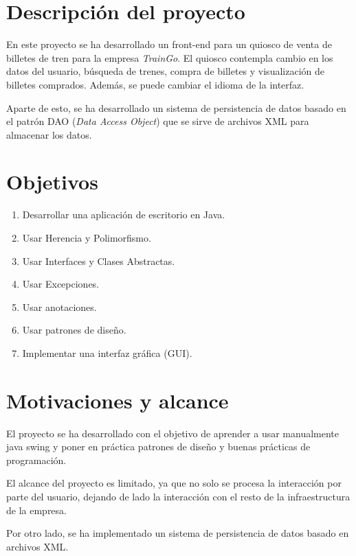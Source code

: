 \section {Descripción del proyecto}\label{sec:descripcion}
En este proyecto se ha desarrollado un front-end para un quiosco de venta de billetes
de tren para la empresa \textit{TrainGo}.
El quiosco contempla cambio en los datos del usuario, búsqueda de trenes,
compra de billetes y visualización de billetes comprados.
Además, se puede cambiar el idioma de la interfaz.

Aparte de esto, se ha desarrollado un sistema de persistencia de datos
basado en el patrón DAO (\textit{Data Access Object}) que se sirve de archivos
XML para almacenar los datos.


\section{Objetivos}\label{sec:objetivos}
\begin{enumerate}
    \item Desarrollar una aplicación de escritorio en Java.
    \item Usar Herencia y Polimorfismo.
    \item Usar Interfaces y Clases Abstractas.
    \item Usar Excepciones.
    \item Usar anotaciones.
    \item Usar patrones de diseño.
    \item Implementar una interfaz gráfica (GUI).
\end{enumerate}


\section{Motivaciones y alcance}\label{sec:motivaciones_y_alcance}

El proyecto se ha desarrollado con el objetivo de aprender a usar manualmente
java swing y poner en práctica patrones de diseño y buenas prácticas de programación.

El alcance del proyecto es limitado, ya que no solo se procesa la interacción por parte
del usuario, dejando de lado la interacción con el resto de la infraestructura de la empresa.

Por otro lado, se ha implementado un sistema de persistencia de datos basado en archivos XML\@.
